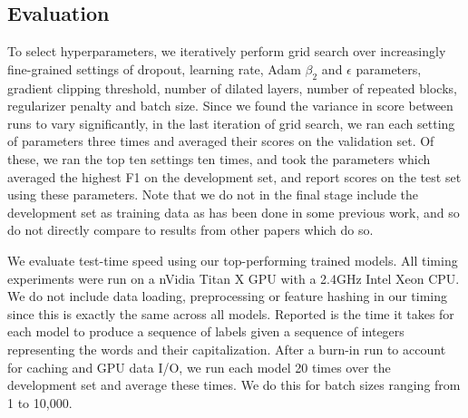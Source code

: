 \subsection{Evaluation}

To select hyperparameters, we iteratively perform grid search over increasingly fine-grained settings of dropout, learning rate, Adam $\beta_2$ and $\epsilon$ parameters, gradient clipping threshold, number of dilated layers, number of repeated blocks, regularizer penalty and batch size. Since we found the variance in score between runs to vary significantly, in the last iteration of grid search, we ran each setting of parameters three times and averaged their scores on the validation set. Of these, we ran the top ten settings ten times, and took the parameters which averaged the highest F1 on the development set, and report scores on the test set using these parameters. Note that we do not in the final stage include the development set as training data as has been done in some previous work, and so do not directly compare to results from other papers which do so.

We evaluate test-time speed using our top-performing trained models. All timing experiments were run on a nVidia Titan X GPU with a 2.4GHz Intel Xeon CPU. We do not include data loading, preprocessing or feature hashing in our timing since this is exactly the same across all models. Reported is the time it takes for each model to produce a sequence of labels given a sequence of integers representing the words and their capitalization. After a burn-in run to account for caching and GPU data I/O, we run each model 20 times over the development set and average these times. We do this for batch sizes ranging from 1 to 10,000. 